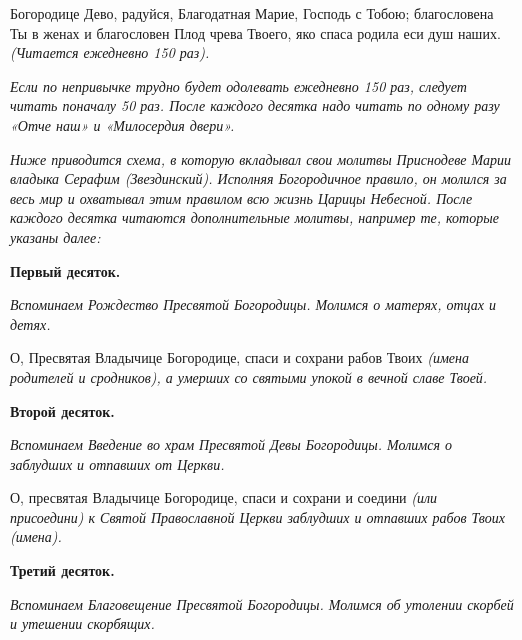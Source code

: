 


 

 

Богородице Дево, радуйся, Благодатная Марие, Господь с Тобою; благословена Ты в женах и благословен Плод чрева Твоего, яко спаса родила еси душ наших. \itshape (Читается ежедневно 150 раз).

\normalfont{}


\itshape Если по непривычке трудно будет одолевать ежедневно 150 раз, следует читать поначалу 50 раз. После каждого десятка надо читать по одному разу «Отче наш» и «Милосердия двери».\normalfont{}


\itshape Ниже приводится схема, в которую вкладывал свои молитвы Приснодеве Марии владыка Серафим (Звездинский). Исполняя Богородичное правило, он молился за весь мир и охватывал этим правилом всю жизнь Царицы Небесной. После каждого десятка читаются дополнительные молитвы, например те, которые указаны далее:\normalfont{}


\medskip


\bfseries Первый десяток.\normalfont{}\nopagebreak


\itshape Вспоминаем Рождество Пресвятой Богородицы. Молимся о матерях, отцах и детях.

\normalfont{}О, Пресвятая Владычице Богородице, спаси и сохрани рабов Твоих \itshape (имена родителей и сродников)\normalfont{}, а умерших со святыми упокой в вечной славе Твоей.


\medskip


\bfseries Второй десяток.\normalfont{}\nopagebreak


\itshape Вспоминаем Введение во храм Пресвятой Девы Богородицы. Молимся о заблудших и отпавших от Церкви\normalfont{}.

О, пресвятая Владычице Богородице, спаси и сохрани и соедини \itshape (или присоедини)\normalfont{} к Святой Православной Церкви заблудших и отпавших рабов Твоих \itshape (имена).\normalfont{}


\medskip


\bfseries Третий десяток.\normalfont{}\nopagebreak


\itshape Вспоминаем Благовещение Пресвятой Богородицы. Молимся об утолении скорбей и утешении скорбящих.


